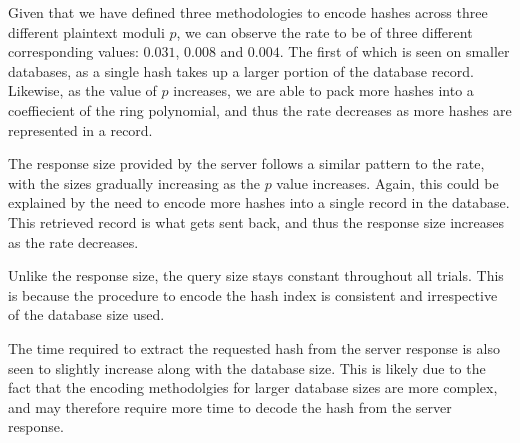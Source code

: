 Given that we have defined three methodologies to encode hashes across three different
plaintext moduli $p$, we can observe the rate to be of three different corresponding
values: $0.031$, $0.008$ and $0.004$. The first of which is seen on smaller databases,
as a single hash takes up a larger portion of the database record. Likewise, as the value
of $p$ increases, we are able to pack more hashes into a coeffiecient of the ring
polynomial, and thus the rate decreases as more hashes are represented in a record.

The response size provided by the server follows a similar pattern to the rate, with the
sizes gradually increasing as the $p$ value increases. Again, this could be explained by
the need to encode more hashes into a single record in the database. This retrieved
record is what gets sent back, and thus the response size increases as the rate decreases.

Unlike the response size, the query size stays constant throughout all trials. This is
because the procedure to encode the hash index is consistent and irrespective of the database
size used.

The time required to extract the requested hash from the server response is also seen to
slightly increase along with the database size. This is likely due to the fact that the
encoding methodolgies for larger database sizes are more complex, and may therefore
require more time to decode the hash from the server response.
